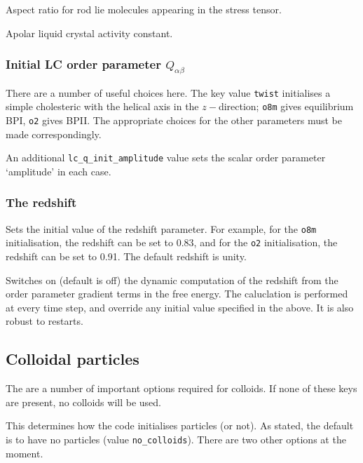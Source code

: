  Aspect ratio for rod lie molecules appearing in the
stress tensor.

 Apolar liquid crystal activity constant.

\subsubsection{Initial LC order parameter $Q_{\alpha\beta}$}


There are a number of useful choices here. The key value
\texttt{twist} initialises a simple cholesteric with the
helical axis in the $z-$direction;  \texttt{o8m}
gives equilibrium BPI, \texttt{o2} gives BPII. The appropriate
choices for the other parameters must be made correspondingly.

An additional \texttt{lc\_q\_init\_amplitude} value sets the
scalar order parameter  `amplitude' in each case.

\subsubsection{The redshift}


Sets the initial value of the redshift parameter. For example,
for the \texttt{o8m} initialisation, the redshift can be set to 0.83,
and for the \texttt{o2} initialisation, the redshift can be set to 0.91.
The default redshift is unity.


Switches on (default is off) the dynamic computation of the redshift
from the order parameter gradient terms in the free energy. The
caluclation is performed at every time step, and override any
initial value specified in the above. It is also robust to restarts.

\subsection{Colloidal particles}

The are a number of important options required for colloids. If
none of these keys are present, no colloids will be used.


This determines how the code initialises particles (or not). As stated, the
default is to have no particles (value \texttt{no\_colloids}). There
are two other options at the moment.

